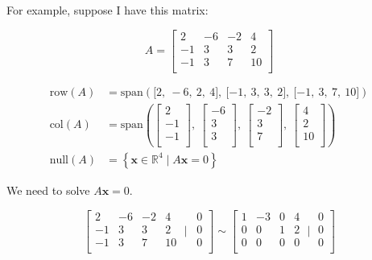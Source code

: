 \documentclass[
]{article}
\newcounter{example}
\begin{document}
For example, suppose I have this matrix:

$$A = \begin{bmatrix}
2 & - 6 & - 2 & 4 \\
 - 1 & 3 & 3 & 2 \\
 - 1 & 3 & 7 & 10 \\
\end{bmatrix}$$

\begin{align*}
\text{row}(A) &= \text{span}\left( \lbrack 2,\  - 6,\ 2,\ 4\rbrack,\ \lbrack - 1,\ 3,\ 3,\ 2\rbrack,\ \lbrack - 1,\ 3,\ 7,\ 10\rbrack \right)
 \\
\text{col}(A) &= \text{span}\left( \begin{bmatrix}
2 \\
 - 1 \\
 - 1 \\
\end{bmatrix},\ \begin{bmatrix}
 - 6 \\
3 \\
3 \\
\end{bmatrix},\ \begin{bmatrix}
 - 2 \\
3 \\
7 \\
\end{bmatrix},\ \begin{bmatrix}
4 \\
2 \\
10 \\
\end{bmatrix} \right)
 \\
\text{null}(A) &= \left\{ \mathbf{x} \in \mathbb{R}^{4}\mid A\mathbf{x} = 0 \right\}
\end{align*}


We need to solve $A\mathbf{x} = 0$.

$$\left\lbrack \begin{matrix}
2 & - 6 & - 2 & 4 \\
 - 1 & 3 & 3 & 2 \\
 - 1 & 3 & 7 & 10 \\
\end{matrix}\mid\,\begin{matrix}
0 \\
0 \\
0 \\
\end{matrix} \right\rbrack\sim\left\lbrack \begin{matrix}
1 & - 3 & 0 & 4 \\
0 & 0 & 1 & 2 \\
0 & 0 & 0 & 0 \\
\end{matrix}\mid\begin{matrix}
0 \\
0 \\
0 \\
\end{matrix} \right\rbrack$$
\end{document}
